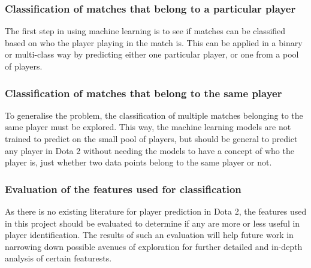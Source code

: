 \documentclass[Report.tex]{subfiles}
\begin{document}
\subsubsection{Classification of matches that belong to a particular player}
The first step in using machine learning is to see if matches can be classified based on who the player playing in the match is. This can be applied in a binary or multi-class way by predicting either one particular player, or one from a pool of players. 

\subsubsection{Classification of matches that belong to the same player}
To generalise the problem, the classification of multiple matches belonging to the same player must be explored. This way, the machine learning models are not trained to predict on the small pool of players, but should be general to predict any player in Dota 2 without needing the models to have a concept of who the player is, just whether two data points belong to the same player or not. 

\subsubsection{Evaluation of the features used for classification}
As there is no existing literature for player prediction in Dota 2, the features used in this project should be evaluated to determine if any are more or less useful in player identification. The results of such an evaluation will help future work in narrowing down possible avenues of exploration for further detailed and in-depth analysis of certain featurests. 






\end{document}

